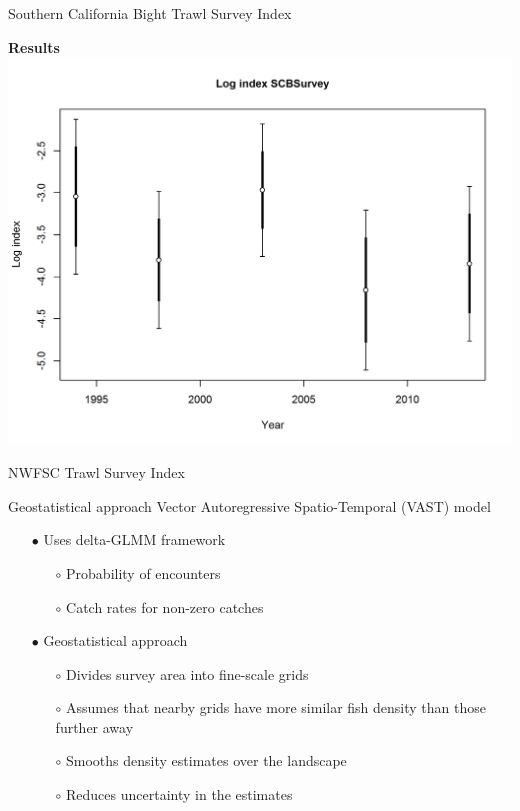 \documentclass[ignorenonframetext,]{beamer}
\begin{document}
\begin{frame}{Southern California Bight Trawl Survey Index}

\textbf{Results}\\
\centering
\includegraphics{r4ss/plots_mod1/index4_logcpuedata_SCBSurvey.png}

\end{frame}

\begin{frame}{NWFSC Trawl Survey Index}

Geostatistical approach Vector Autoregressive Spatio-Temporal (VAST)
model

\begin{itemize}
\item[$\bullet$] Uses delta-GLMM framework
\begin{itemize}
\item[$\circ$] Probability of encounters
\item[$\circ$] Catch rates for non-zero catches
\end{itemize}
\item[$\bullet$] Geostatistical approach
\begin{itemize}
\item[$\circ$] Divides survey area into fine-scale grids
\item[$\circ$] Assumes that nearby grids have more similar fish density than those further away
\item[$\circ$] Smooths density estimates over the landscape
\item[$\circ$] Reduces uncertainty in the estimates
\end{itemize}
\end{itemize}

\end{frame}
\end{document}
